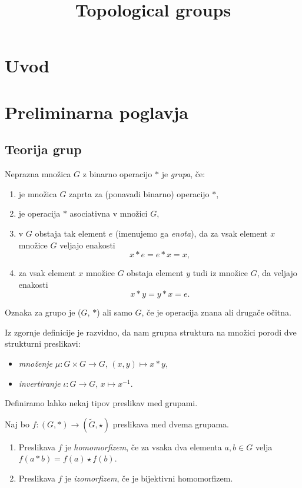 \documentclass[mat1]{fmfdelo}
\title{Topological groups}
\begin{document}
\section{Uvod}

\section{Preliminarna poglavja}

\subsection{Teorija grup}
\begin{definicija}\label{def:grupa}
Neprazna množica $G$ z binarno operacijo $*$ je \emph{grupa}, če:
\begin{enumerate}
\item je množica $G$ zaprta za (ponavadi binarno) operacijo $*$,
\item je operacija $*$ asociativna v množici $G$,
\item v $G$ obstaja tak element $e$ (imenujemo ga \emph{enota}), da za vsak element $x$ množice $G$ veljajo enakosti \[ x*e = e*x = x, \]
\item za vsak element $x$ množice $G$ obstaja element $y$ tudi iz množice $G$, da veljajo enakosti \[ x*y = y*x = e. \]
\end{enumerate}
Oznaka za grupo je ($G$, $*$) ali samo $G$, če je operacija znana ali drugače očitna.
\end{definicija}

Iz zgornje definicije je razvidno, da nam grupna struktura na množici porodi dve strukturni preslikavi:
\begin{itemize}
\item \emph{množenje} $\mu: G \times G \to G$, $(x, y) \mapsto x*y$,
\item \emph{invertiranje} $\iota: G \to G$, $x \mapsto x^{-1}$.
\end{itemize}

Definiramo lahko nekaj tipov preslikav med grupami.

\begin{definicija}\label{def:algpreslikave}
Naj bo $f: (G, *) \to (\widetilde{G}, \star)$ preslikava med dvema grupama.
\begin{enumerate}
\item Preslikava $f$ je \emph{homomorfizem}, če za vsaka dva elementa $a, b \in G$ velja $f(a*b) = f(a) \star f(b)$.
\item Preslikava $f$ je \emph{izomorfizem}, če je bijektivni homomorfizem.
\end{enumerate}
\end{definicija}
\end{document}
